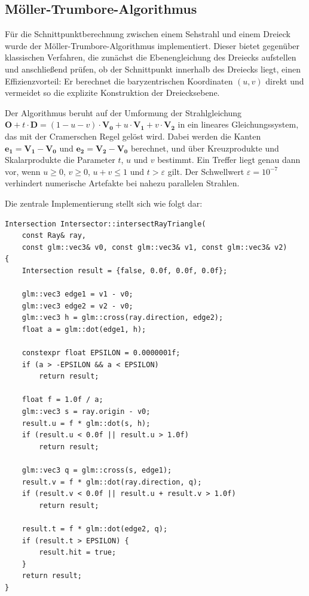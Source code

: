 \documentclass[11pt, a4paper]{article}
\begin{document}
\newpage
\subsection{Möller-Trumbore-Algorithmus}

Für die Schnittpunktberechnung zwischen einem Sehstrahl und einem Dreieck wurde der Möller-Trumbore-Algorithmus implementiert. Dieser bietet gegenüber klassischen Verfahren, die zunächst die Ebenengleichung des Dreiecks aufstellen und anschließend prüfen, ob der Schnittpunkt innerhalb des Dreiecks liegt, einen Effizienzvorteil: Er berechnet die baryzentrischen Koordinaten $(u, v)$ direkt und vermeidet so die explizite Konstruktion der Dreiecksebene.

Der Algorithmus beruht auf der Umformung der Strahlgleichung $\mathbf{O} + t \cdot \mathbf{D} = (1 - u - v) \cdot \mathbf{V_0} + u \cdot \mathbf{V_1} + v \cdot \mathbf{V_2}$ in ein lineares Gleichungssystem, das mit der Cramerschen Regel gelöst wird. Dabei werden die Kanten $\mathbf{e_1} = \mathbf{V_1} - \mathbf{V_0}$ und $\mathbf{e_2} = \mathbf{V_2} - \mathbf{V_0}$ berechnet, und über Kreuzprodukte und Skalarprodukte die Parameter $t$, $u$ und $v$ bestimmt. Ein Treffer liegt genau dann vor, wenn $u \geq 0$, $v \geq 0$, $u + v \leq 1$ und $t > \varepsilon$ gilt. Der Schwellwert $\varepsilon = 10^{-7}$ verhindert numerische Artefakte bei nahezu parallelen Strahlen.

Die zentrale Implementierung stellt sich wie folgt dar:

\noindent\begin{minipage}{\textwidth}
\begin{lstlisting}[caption={Möller-Trumbore-Schnittpunkttest}]
Intersection Intersector::intersectRayTriangle(
    const Ray& ray,
    const glm::vec3& v0, const glm::vec3& v1, const glm::vec3& v2)
{
    Intersection result = {false, 0.0f, 0.0f, 0.0f};

    glm::vec3 edge1 = v1 - v0;
    glm::vec3 edge2 = v2 - v0;
    glm::vec3 h = glm::cross(ray.direction, edge2);
    float a = glm::dot(edge1, h);

    constexpr float EPSILON = 0.0000001f;
    if (a > -EPSILON && a < EPSILON)
        return result;

    float f = 1.0f / a;
    glm::vec3 s = ray.origin - v0;
    result.u = f * glm::dot(s, h);
    if (result.u < 0.0f || result.u > 1.0f)
        return result;

    glm::vec3 q = glm::cross(s, edge1);
    result.v = f * glm::dot(ray.direction, q);
    if (result.v < 0.0f || result.u + result.v > 1.0f)
        return result;

    result.t = f * glm::dot(edge2, q);
    if (result.t > EPSILON) {
        result.hit = true;
    }
    return result;
}
\end{lstlisting}
\end{minipage}
\end{document}
